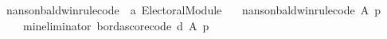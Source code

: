 \begin{isabellebody}
\isanewline
{}\isamarkupfalse%
\ nanson{\isacharunderscore}{\kern0pt}baldwin{\isacharunderscore}{\kern0pt}rule{\isacharunderscore}{\kern0pt}code\ {\isacharcolon}{\kern0pt}{\isacharcolon}{\kern0pt}\ {\isachardoublequoteopen}{\isacharprime}{\kern0pt}a\ Electoral{\isacharunderscore}{\kern0pt}Module{\isachardoublequoteclose}\ \isanewline
\ \ {\isachardoublequoteopen}nanson{\isacharunderscore}{\kern0pt}baldwin{\isacharunderscore}{\kern0pt}rule{\isacharunderscore}{\kern0pt}code\ A\ p\ {\isacharequal}{\kern0pt}\isanewline
\ \ \ \ {\isacharparenleft}{\kern0pt}{\isacharparenleft}{\kern0pt}min{\isacharunderscore}{\kern0pt}eliminator\ borda{\isacharunderscore}{\kern0pt}score{\isacharunderscore}{\kern0pt}code{\isacharparenright}{\kern0pt}\ {\isasymcirclearrowleft}\isactrlsub {\isasymexists}\isactrlsub {\isacharbang}{\kern0pt}\isactrlsub d{\isacharparenright}{\kern0pt}\ A\ p{\isachardoublequoteclose}\isanewline
%
\isadelimtheory
\isanewline
%
\endisadelimtheory
%
\isatagtheory
{}\isamarkupfalse%
%
\endisatagtheory
{\isafoldtheory}%
%
\isadelimtheory
%
\endisadelimtheory
%
\end{isabellebody}%
\endinput
